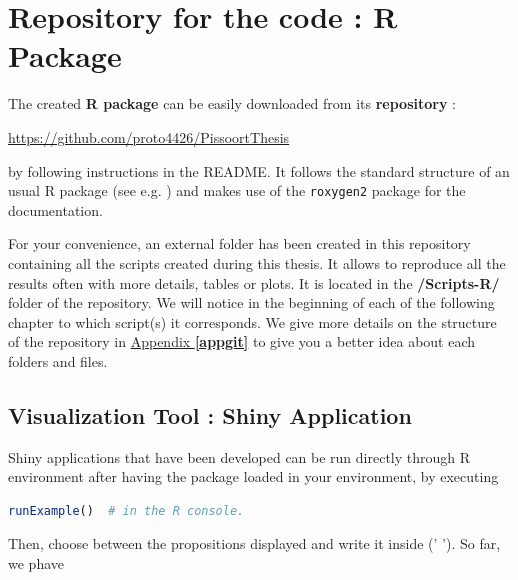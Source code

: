 
\section*{Repository for the code : R Package}

The created \textbf{R package} can be easily downloaded from its \textbf{repository} :
\begin{center}\label{xxx}
 \url{https://github.com/proto4426/PissoortThesis}
\end{center}
by following instructions in the README. It follows the standard structure of an usual R package (see e.g. \citet{leisch_creating_2008}) and makes use of the \texttt{roxygen2} package for the documentation.

For your convenience, an external folder has been created in this repository containing all the scripts created during this thesis. It allows to reproduce all the results often with more details, tables or plots. It is located in the \textbf{/Scripts-R/} folder of the repository. We will notice in the beginning of each of the following chapter to which script(s) it corresponds. We give more details on the structure of the repository in \hyperref[appgit]{Appendix \textbf{\ref{appgit}}} to give you a better idea about each folders and files.

\subsection*{Visualization Tool : Shiny Application}

Shiny applications that have been developed can be run directly through R environment after having the package loaded in your environment, by executing 

\begin{center}
\begin{lstlisting}[language=R]
runExample()  # in the R console. 
\end{lstlisting}
\end{center}
Then, choose between the propositions displayed and write it inside (' ').
So far, we phave

